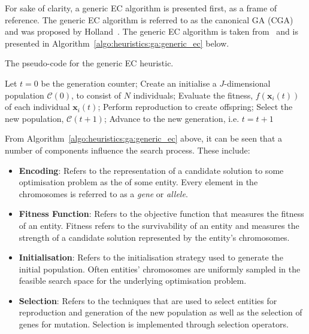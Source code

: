{For sake of clarity, a generic \acs{EC} algorithm is presented first, as a frame of reference. The generic \acs{EC} algorithm is referred to as the canonical \acs{GA} (CGA) and was proposed by Holland~\cite{ref:holland:1992}. The generic \acs{EC} algorithm is taken from~\cite{ref:engelbrecht:2007} and is presented in Algorithm~\ref{algo:heuristics:ga:generic_ec} below.

\begin{algorithm}[htb]
	\caption{The pseudo-code for the generic \acs{EC} heuristic.}
	\label{algo:heuristics:ga:generic_ec}
	\begin{algorithmic}
		\State Let $t = 0$ be the generation counter;
		\State Create an initialise a $J$-dimensional population $\mathcal{C}(0)$, to consist of $N$ individuals;
		\State Evaluate the fitness, $f(\boldsymbol{x}_{i}(t))$ of each individual $\boldsymbol{x}_{i}(t)$;
		\State Perform reproduction to create offspring;
		\State Select the new population, $\mathcal{C}(t+1)$;
		\State Advance to the new generation, i.e. $t = t + 1$
		\EndWhile
		\State
	\end{algorithmic}
\end{algorithm}

From Algorithm~\ref{algo:heuristics:ga:generic_ec} above, it can be seen that a number of components influence the search process. These include:

\begin{itemize}
	\item \textbf{Encoding}: Refers to the representation of a candidate solution to some optimisation problem as the  of some entity. Every element in the chromosomes is referred to as a \textit{gene} or \textit{allele}.

	\item \textbf{Fitness Function}: Refers to the objective function that measures the fitness of an entity. Fitness refers to the survivability of an entity and measures the strength of a candidate solution represented by the entity's chromosomes.

	\item \textbf{Initialisation}: Refers to the initialisation strategy used to generate the initial population. Often entities' chromosomes are uniformly sampled in the feasible search space for the underlying optimisation problem.

	\item \textbf{Selection}: Refers to the techniques that are used to select entities for reproduction and generation of the new population as well as the selection of genes for mutation. Selection is implemented through selection operators.


\end{itemize}}
